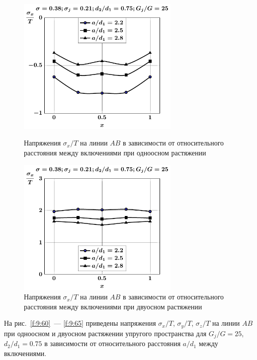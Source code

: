 \begin{figure}[h!]
\centering\footnotesize
\parbox[b]{7.5cm}{\centering\includegraphics[width=7.8cm]{inc4-a-d75-g25-t1-sig_x.pdf}
\caption{Напряжения $\sigma_x/T$ на линии $AB$ в зависимости от относительного расстояния между включениями при одноосном растяжении
\label{f:9:60}}}\hfil\hfil
\parbox[b]{7.5cm}{\centering\includegraphics[width=7.8cm]{inc4-a-d75-g25-t2-sig_x.pdf}
\caption{Напряжения $\sigma_x/T$ на линии $AB$ в зависимости от относительного расстояния между включениями при двуосном растяжении
\label{f:9:61}}}
\end{figure}

На рис.~\ref{f:9:60}~--- \ref{f:9:65} приведены напряжения $\sigma_x/T$, $\sigma_y/T$, $\sigma_z/T$ на линии $AB$ при одноосном и двуосном растяжении упругого пространства для $G_j/G=25$, $d_2/d_1=0.75$ в зависимости от относительного расстояния $a/d_1$ между включениями.

